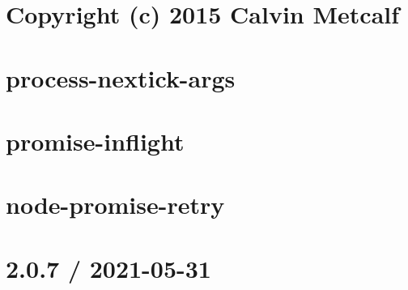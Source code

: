 \documentclass[twoside]{book}
\newcommand{\+}{\discretionary{\mbox{\scriptsize$\hookleftarrow$}}{}{}}
\begin{document}
\chapter{Copyright (c) 2015 Calvin Metcalf}
\label{md__c___users_vaishnavi_jadhav__desktop__developer_code_mean_stack_example_client_node_modules_process_nextick_args_license}

\chapter{process-\/nextick-\/args}
\label{md__c___users_vaishnavi_jadhav__desktop__developer_code_mean_stack_example_client_node_modules_process_nextick_args_readme}

\chapter{promise-\/inflight}
\label{md__c___users_vaishnavi_jadhav__desktop__developer_code_mean_stack_example_client_node_modules_promise_inflight__r_e_a_d_m_e}

\chapter{node-\/promise-\/retry}
\label{md__c___users_vaishnavi_jadhav__desktop__developer_code_mean_stack_example_client_node_modules_promise_retry__r_e_a_d_m_e}

\chapter{2.0.7 / 2021-\/05-\/31}
\label{md__c___users_vaishnavi_jadhav__desktop__developer_code_mean_stack_example_client_node_modules_proxy_addr__h_i_s_t_o_r_y}

\end{document}
